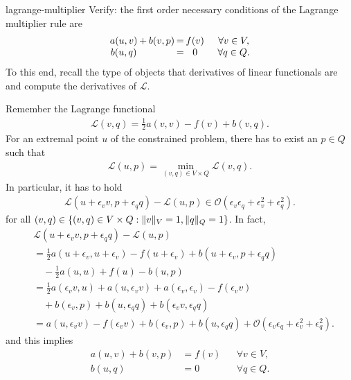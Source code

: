 \begin{Problem}{lagrange-multiplier}
  Verify: the first order necessary conditions of the Lagrange
  multiplier rule are
  \begin{gather*}
    \arraycolsep.1em
    \begin{matrix}
      a(u,v) &+& b(v,p) &=& f(v) &\quad&\forall v\in V, \\
      b(u,q) && &=& 0 &&\forall q\in Q.
    \end{matrix}
  \end{gather*}
  To this end, recall the type of objects that derivatives of linear
  functionals are and compute the derivatives of $\mathscr{L}$.
\begin{solution}
Remember the Lagrange functional
\begin{align*}
 \mathscr{L}(v,q) = \tfrac12 a(v,v) - f(v) + b(v,q).
\end{align*}
For an extremal point $u$ of the constrained problem,
there has to exist an $p\in Q$ such that
\begin{align*}
  \mathscr{L}(u,p) = \min_{(v,q)\in V\times Q} \mathscr{L}(v,q).
\end{align*}
In particular, it has to hold
\begin{align*}
  \mathscr{L}(u+\epsilon_v v,p+\epsilon_q q) -\mathscr{L}(u,p)\in\mathcal{O}(\epsilon_v\epsilon_q+\epsilon_v^2+\epsilon_q^2).
\end{align*}
for all $(v,q)\in\{(v,q)\in V\times Q: \lVert v\rVert_V=1, \lVert q\rVert_Q=1\}$.
In fact,
\begin{align*}
 &\mathscr{L}(u+\epsilon_v v,p+\epsilon_q q) - \mathscr{L}(u,p)\\
 &=\tfrac12 a(u+\epsilon_v,u+\epsilon_v) - f(u+\epsilon_v) + b(u+\epsilon_v,p+\epsilon_q q)\\&\quad
   -\tfrac12 a(u,u) + f(u) - b(u,p)\\
   &=\tfrac12 a(\epsilon_v v,u)+a(u,\epsilon_v v)+a(\epsilon_v,\epsilon_v) - f(\epsilon_v v)\\&\quad + b(\epsilon_v,p )+b(u,\epsilon_q q)+b(\epsilon_v v,\epsilon_q q)\\
   &=a(u, \epsilon_v v)-f(\epsilon_v v) + b(\epsilon_v,p )+b(u,\epsilon_q q)+\mathcal{O}(\epsilon_v\epsilon_q+\epsilon_v^2+\epsilon_q^2).
\end{align*}
and this implies
\begin{align*}
      a(u,v) + b(v,p)  &= f(v) &&\forall v\in V, \\
               b(u,q)  &= 0    &&\forall q\in Q.
\end{align*}
\end{solution}
\end{Problem}


